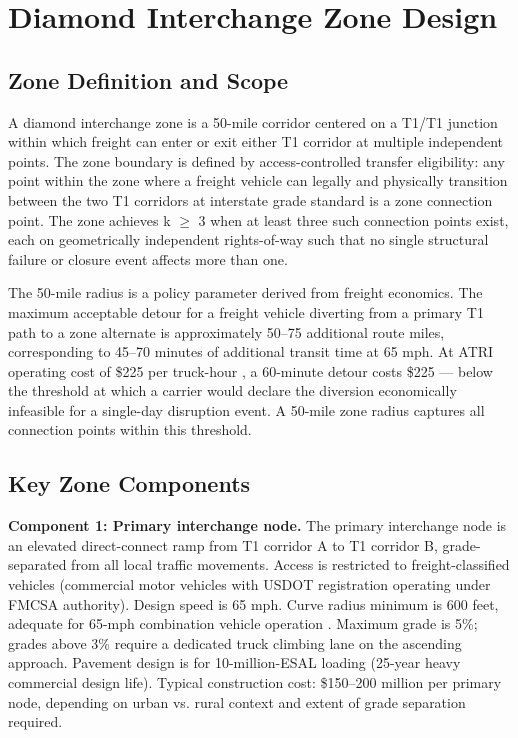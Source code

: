 \section{Diamond Interchange Zone Design}
\label{sec:diamond-design}

\subsection{Zone Definition and Scope}

A diamond interchange zone is a 50-mile corridor centered on a T1/T1 junction within which freight can enter or exit either T1 corridor at multiple independent points. The zone boundary is defined by access-controlled transfer eligibility: any point within the zone where a freight vehicle can legally and physically transition between the two T1 corridors at interstate grade standard is a zone connection point. The zone achieves k $\geq$ 3 when at least three such connection points exist, each on geometrically independent rights-of-way such that no single structural failure or closure event affects more than one.

The 50-mile radius is a policy parameter derived from freight economics. The maximum acceptable detour for a freight vehicle diverting from a primary T1 path to a zone alternate is approximately 50--75 additional route miles, corresponding to 45--70 minutes of additional transit time at 65 mph. At ATRI operating cost of \$225 per truck-hour \citep{ATRI_costs2024}, a 60-minute detour costs \$225 --- below the threshold at which a carrier would declare the diversion economically infeasible for a single-day disruption event. A 50-mile zone radius captures all connection points within this threshold.

\subsection{Key Zone Components}

\textbf{Component 1: Primary interchange node.} The primary interchange node is an elevated direct-connect ramp from T1 corridor A to T1 corridor B, grade-separated from all local traffic movements. Access is restricted to freight-classified vehicles (commercial motor vehicles with USDOT registration operating under FMCSA authority). Design speed is 65 mph. Curve radius minimum is 600 feet, adequate for 65-mph combination vehicle operation \citep{HCM7}. Maximum grade is 5\%; grades above 3\% require a dedicated truck climbing lane on the ascending approach. Pavement design is for 10-million-ESAL loading (25-year heavy commercial design life). Typical construction cost: \$150--200 million per primary node, depending on urban vs. rural context and extent of grade separation required.

